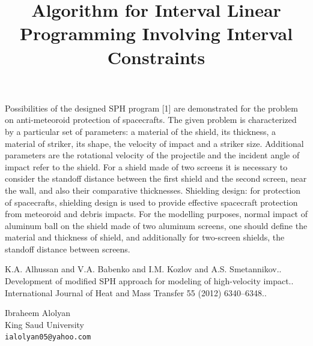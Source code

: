 \documentclass[article, A4, 11pt]{llncs}%
\begin{document}
Possibilities of the designed SPH program [1] are demonstrated for the problem on anti-meteoroid protection of spacecrafts. The given problem is characterized by a particular set of parameters: a material of the shield, its thickness, a material of striker, its shape, the velocity of impact and a striker size. Additional parameters are the rotational velocity of the projectile and the incident angle of impact refer to the shield. For a shield made of two screens it is necessary to consider the standoff distance between the first shield and the second screen, near the wall, and also their comparative thicknesses. Shielding design: for protection of spacecrafts, shielding design is used to provide effective spacecraft protection from meteoroid and debris impacts. For the modelling purposes, normal impact of aluminum ball on the shield made of two aluminum screens, one should define the material and thickness of shield, and additionally for two-screen shields, the standoff distance between screens.



\begin{thebibliography}{10}
{\sc K.A. Alhussan and V.A. Babenko and I.M. Kozlov and A.S. Smetannikov.}. {Development of modified SPH approach for modeling of high-velocity impact.}. International Journal of Heat and Mass Transfer 55 (2012) 6340–6348..
\end{thebibliography} %

\title{Algorithm for Interval Linear  Programming Involving Interval Constraints}
 \author{} \institute{}
\maketitle
\begin{center}
{\large Ibraheem Alolyan}\\
King Saud University\\
{\tt ialolyan05@yahoo.com}
\end{center}
\end{document}
